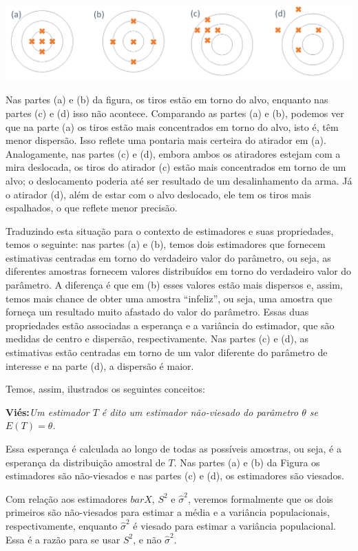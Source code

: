 \documentclass[
]{book}
\begin{document}
\includegraphics{Estimadores_exemplo.png}

Nas partes (a) e (b) da figura, os tiros estão em torno do alvo, enquanto nas partes (c) e (d) isso não acontece. Comparando as partes (a) e (b), podemos ver que na parte (a) os tiros estão mais concentrados em torno do alvo, isto é, têm menor dispersão. Isso reflete uma pontaria mais certeira do atirador em (a). Analogamente, nas partes (c) e (d), embora ambos os atiradores estejam com a mira deslocada, os tiros do atirador (c) estão mais concentrados em torno de um alvo; o deslocamento poderia até ser resultado de um desalinhamento da arma. Já o atirador (d), além de estar com o alvo deslocado, ele tem os tiros mais espalhados, o que reflete menor precisão.

Traduzindo esta situação para o contexto de estimadores e suas propriedades, temos o seguinte: nas partes (a) e (b), temos dois estimadores que fornecem estimativas centradas em torno do verdadeiro valor do parâmetro, ou seja, as diferentes amostras fornecem valores distribuídos em torno do verdadeiro valor do parâmetro. A diferença é que em (b) esses valores estão mais dispersos e, assim, temos mais chance de obter uma amostra ``infeliz'', ou seja, uma amostra que forneça um resultado muito afastado do valor do parâmetro. Essas duas propriedades estão associadas a esperança e a variância do estimador, que são medidas de centro e dispersão, respectivamente. Nas partes (c) e (d), as estimativas estão centradas em torno de um valor diferente do parâmetro de interesse e na parte (d), a dispersão é maior.

Temos, assim, ilustrados os seguintes conceitos:

\textbf{Viés:}\emph{Um estimador $T$ é dito um estimador não-viesado do parâmetro $\theta$ se $E(T)=\theta$.}

Essa esperança é calculada ao longo de todas as possíveis amostras, ou seja, é a esperança da distribuição amostral de \(T\). Nas partes (a) e (b) da Figura os estimadores são não-viesados e nas partes (c) e (d), os estimadores são viesados.

Com relação aos estimadores \(bar X\), \(S^2\) e \(\hat \sigma^2\), veremos formalmente que os dois primeiros são não-viesados para estimar a média e a variância populacionais, respectivamente, enquanto \(\hat \sigma^2\) é viesado para estimar a variância populacional. Essa é a razão para se usar \(S^2\), e não \(\hat \sigma^2\).
\end{document}
